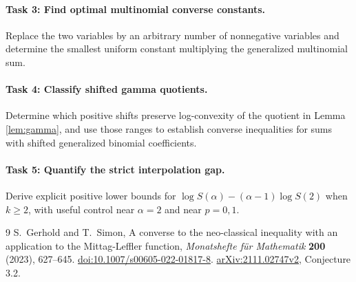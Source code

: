 \documentclass[11pt]{article}
\begin{document}
\paragraph{Task 3: Find optimal multinomial converse constants.}
Replace the two variables by an arbitrary number of nonnegative
variables and determine the smallest uniform constant multiplying
the generalized multinomial sum.

\paragraph{Task 4: Classify shifted gamma quotients.}
Determine which positive shifts preserve log-convexity of the quotient
in Lemma \ref{lem:gamma}, and use those ranges to establish converse
inequalities for sums with shifted generalized binomial coefficients.

\paragraph{Task 5: Quantify the strict interpolation gap.}
Derive explicit positive lower bounds for
\(\log S(\alpha)-(\alpha-1)\log S(2)\) when \(k\geq2\),
with useful control near \(\alpha=2\) and near \(p=0,1\).

\begin{thebibliography}{9}
S.\ Gerhold and T.\ Simon,
A converse to the neo-classical inequality with an application to the
Mittag-Leffler function,
\emph{Monatshefte f\"ur Mathematik} \textbf{200} (2023), 627--645.
\href{https://doi.org/10.1007/s00605-022-01817-8}{doi:10.1007/s00605-022-01817-8}.
\href{https://arxiv.org/abs/2111.02747}{arXiv:2111.02747v2},
Conjecture 3.2.
\end{thebibliography}
\end{document}
